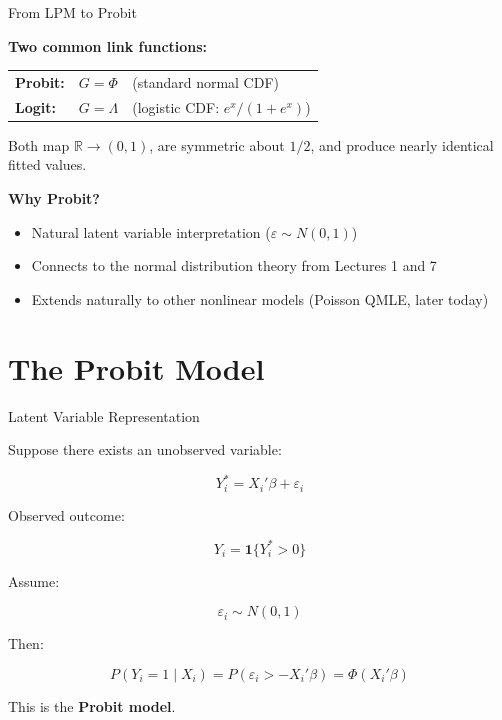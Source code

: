 \documentclass[aspectratio=169, handout, t]{beamer}
\numberwithin{equation}{section}
\begin{document}
\begin{frame}{From LPM to Probit}

\textbf{Two common link functions:}

\medskip

\begin{tabular}{lll}
\textbf{Probit:} & $G = \Phi$ & (standard normal CDF) \\
\textbf{Logit:} & $G = \Lambda$ & (logistic CDF: $e^x/(1+e^x)$)
\end{tabular}

\pause

\bigskip

Both map $\mathbb{R} \to (0,1)$, are symmetric about $1/2$, and produce nearly identical fitted values.

\pause

\bigskip

\textbf{Why Probit?}
\begin{itemize}
    \item Natural latent variable interpretation ($\varepsilon \sim N(0,1)$)
    \item Connects to the normal distribution theory from Lectures 1 and 7
    \item Extends naturally to other nonlinear models (Poisson QMLE, later today)
\end{itemize}

\end{frame}

\section{The Probit Model}

\begin{frame}{Latent Variable Representation}

Suppose there exists an unobserved variable:

\[
Y_i^* = X_i'\beta + \varepsilon_i
\]

\pause

Observed outcome:

\[
Y_i = \mathbf{1}\{Y_i^* > 0\}
\]

\pause

Assume:

\[
\varepsilon_i \sim N(0,1)
\]

\pause

Then:

\[
P(Y_i=1 \mid X_i)
=
P(\varepsilon_i > -X_i'\beta)
=
\Phi(X_i'\beta)
\]

\pause

This is the \textbf{Probit model}.
\end{frame}
\end{document}
